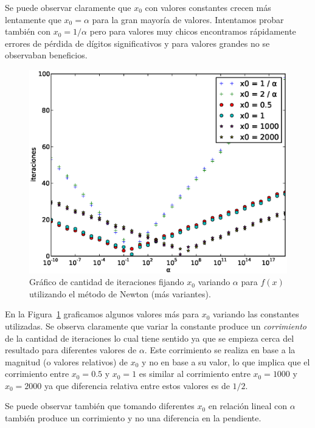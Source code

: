 Se puede observar claramente que $x_0$ con valores constantes crecen más
lentamente que $x_0 = \alpha$ para la gran mayoría de valores. Intentamos
probar también con $x_0 = 1 / \alpha$ pero para valores muy chicos encontramos
rápidamente errores de pérdida de dígitos significativos y para valores grandes
no se observaban beneficios.

\begin{figure}[!htbp]
  \begin{center}
    \includegraphics[scale=0.5]{graficos/new/f_newton_x0_fijo_2.eps}
    \caption{\label{fig:f_newton_x0_fijo_2} Gráfico de cantidad de iteraciones fijando $x_0$ variando $\alpha$ para $f(x)$ utilizando el método de Newton (más variantes).}
  \end{center}
\end{figure}

En la Figura~\ref{fig:f_newton_x0_fijo_2} graficamos algunos valores más para
$x_0$ variando las constantes utilizadas. Se observa claramente que variar la
constante produce un \emph{corrimiento} de la cantidad de iteraciones lo cual
tiene sentido ya que se empieza cerca del resultado para diferentes valores de
$\alpha$. Este corrimiento se realiza en base a la magnitud (o valores relativos)
de $x_0$ y no en base a su valor, lo que implica que el corrimiento entre $x_0
= 0.5$ y $x_0 = 1$ es similar al corrimiento entre $x_0 = 1000$ y $x_0 = 2000$
ya que diferencia relativa entre estos valores es de $1/2$.

Se puede observar también que tomando diferentes $x_0$ en relación lineal con
$\alpha$ también produce un corrimiento y no una diferencia en la pendiente.

